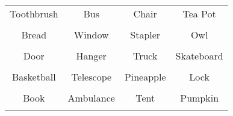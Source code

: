 \documentclass[12pt,a4paper]{article}
\begin{document}
\thispagestyle{empty}
\begin{table}[]
\centering
\Huge
\begin{tabular}{cccc}
 Toothbrush& Bus& Chair& Tea Pot\\  & & & \\
 Bread& Window& Stapler& Owl\\  & & & \\
 Door& Hanger& Truck& Skateboard\\  & & & \\
 Basketball& Telescope& Pineapple& Lock\\  & & & \\
 Book& Ambulance& Tent& Pumpkin\\  & & & \\
\end{tabular}
\end{table}
\end{document}
